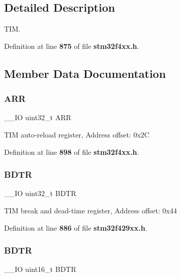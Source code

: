 \subsection{Detailed Description}
T\+IM. 

Definition at line \textbf{ 875} of file \textbf{ stm32f4xx.\+h}.



\subsection{Member Data Documentation}
\mbox{\label{structTIM__TypeDef_af17f19bb4aeea3cc14fa73dfa7772cb8}} 
\subsubsection{A\+RR}
{\footnotesize\ttfamily \+\_\+\+\_\+\+IO uint32\+\_\+t A\+RR}

T\+IM auto-\/reload register, Address offset\+: 0x2C 

Definition at line \textbf{ 898} of file \textbf{ stm32f4xx.\+h}.

\mbox{\label{structTIM__TypeDef_a476bae602205d6a49c7e71e2bda28c0a}} 
\subsubsection{B\+D\+TR\hspace{0.1cm}{\footnotesize\ttfamily [1/2]}}
{\footnotesize\ttfamily \+\_\+\+\_\+\+IO uint32\+\_\+t B\+D\+TR}

T\+IM break and dead-\/time register, Address offset\+: 0x44 

Definition at line \textbf{ 886} of file \textbf{ stm32f429xx.\+h}.

\mbox{\label{structTIM__TypeDef_a112c0403ac38905a70cf5aaa9c8cc38a}} 
\subsubsection{B\+D\+TR\hspace{0.1cm}{\footnotesize\ttfamily [2/2]}}
{\footnotesize\ttfamily \+\_\+\+\_\+\+IO uint16\+\_\+t B\+D\+TR}

